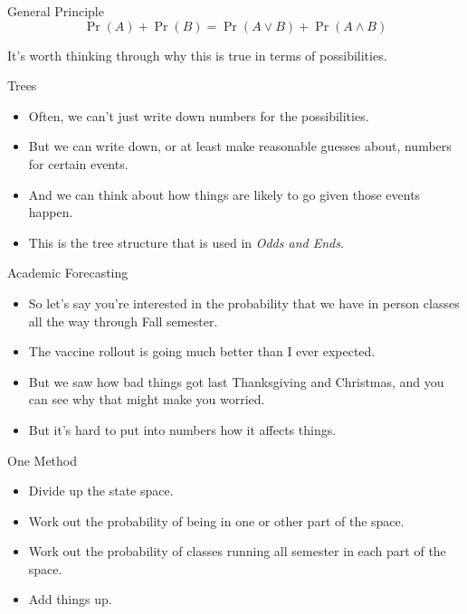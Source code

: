 \documentclass[
  ignorenonframetext,
]{beamer}
\providecommand{\tightlist}{%
  \setlength{\itemsep}{0pt}\setlength{\parskip}{0pt}}
\begin{document}
\begin{frame}{General Principle}
\protect\hypertarget{general-principle}{}
\[
\Pr(A) + \Pr(B) = \Pr(A \vee B) + \Pr(A \wedge B)
\]

\pause

It's worth thinking through why this is true in terms of possibilities.
\end{frame}

\begin{frame}{Trees}
\protect\hypertarget{trees}{}
\begin{itemize}
\tightlist
\item
  Often, we can't just write down numbers for the possibilities.
\item
  But we can write down, or at least make reasonable guesses about,
  numbers for certain events.
\item
  And we can think about how things are likely to go given those events
  happen.
\item
  This is the tree structure that is used in \emph{Odds and Ends}.
\end{itemize}
\end{frame}

\begin{frame}{Academic Forecasting}
\protect\hypertarget{academic-forecasting}{}
\begin{itemize}
\tightlist
\item
  So let's say you're interested in the probability that we have in
  person classes all the way through Fall semester.
\item
  The vaccine rollout is going much better than I ever expected.
\item
  But we saw how bad things got last Thanksgiving and Christmas, and you
  can see why that might make you worried.
\item
  But it's hard to put into numbers how it affects things.
\end{itemize}
\end{frame}

\begin{frame}{One Method}
\protect\hypertarget{one-method}{}
\begin{itemize}
\tightlist
\item
  Divide up the state space.
\item
  Work out the probability of being in one or other part of the space.
\item
  Work out the probability of classes running all semester in each part
  of the space.
\item
  Add things up.
\end{itemize}
\end{frame}
\end{document}
